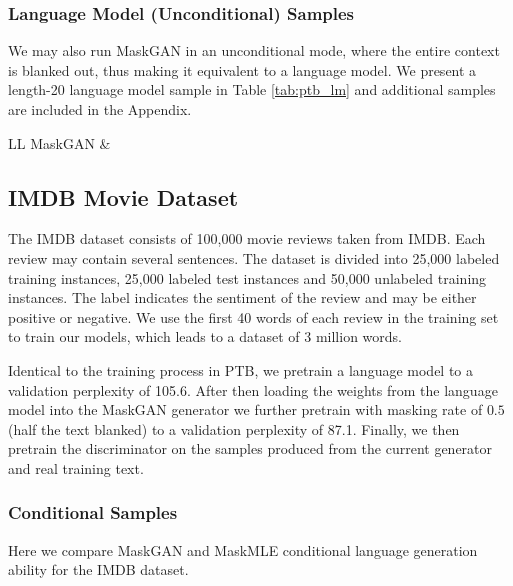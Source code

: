\subsubsection{Language Model (Unconditional) Samples}
We may also run MaskGAN in an unconditional mode, where the entire context is blanked out, thus making it equivalent to a language model.  We present a length-20 language model sample in Table \ref{tab:ptb_lm} and additional samples are included in the Appendix. 

\begin{table}[ht]
  \begin{tabular}{LL} \toprule
    MaskGAN &  \\\bottomrule

  \end{tabular}
  \caption{Language model (unconditional) sample from PTB for MaskGAN.}
  \label{tab:ptb_lm}
\end{table}



\subsection{IMDB Movie Dataset}
The IMDB dataset \cite{maas2011learning} consists of 100,000 movie reviews taken from IMDB.  Each review may contain several sentences.  The dataset is divided into 25,000 labeled training instances, 25,000 labeled test instances and 50,000 unlabeled training instances.  The label indicates the sentiment of the review and may be either positive or negative.  We use the first 40 words of each review in the training set to train our models, which leads to a dataset of 3 million words.

Identical to the training process in PTB, we pretrain a language model to a validation perplexity of 105.6.  After then loading the weights from the language model into the MaskGAN generator we further pretrain with masking rate of $0.5$ (half the text blanked) to a validation perplexity of 87.1.  Finally, we then pretrain the discriminator on the samples produced from the current generator and real training text.

\subsubsection{Conditional Samples}
Here we compare MaskGAN and MaskMLE conditional language generation ability for the IMDB dataset. 

